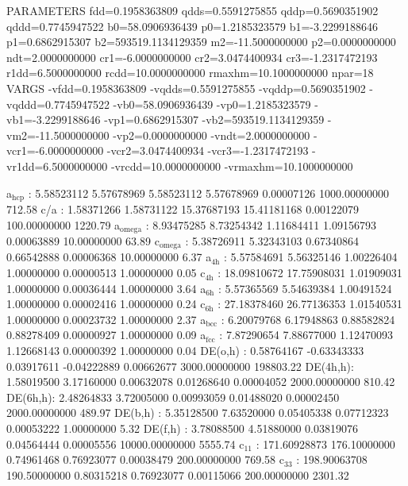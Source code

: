 \documentclass[11pt]{article}
\begin{document}
PARAMETERS
  fdd=0.1958363809 qdds=0.5591275855 qddp=0.5690351902 qddd=0.7745947522 b0=58.0906936439 p0=1.2185323579 b1=-3.2299188646 p1=0.6862915307 b2=593519.1134129359 m2=-11.5000000000 p2=0.0000000000 ndt=2.0000000000 cr1=-6.0000000000 cr2=3.0474400934 cr3=-1.2317472193 r1dd=6.5000000000 rcdd=10.0000000000 rmaxhm=10.1000000000 npar=18 
VARGS
    -vfdd=0.1958363809 -vqdds=0.5591275855 -vqddp=0.5690351902 -vqddd=0.7745947522 -vb0=58.0906936439 -vp0=1.2185323579 -vb1=-3.2299188646 -vp1=0.6862915307 -vb2=593519.1134129359 -vm2=-11.5000000000 -vp2=0.0000000000 -vndt=2.0000000000 -vcr1=-6.0000000000 -vcr2=3.0474400934 -vcr3=-1.2317472193 -vr1dd=6.5000000000 -vrcdd=10.0000000000 -vrmaxhm=10.1000000000 

a\(_{\text{hcp}}\)   :   5.58523112   5.57678969   5.58523112   5.57678969   0.00007126 1000.00000000       712.58
c/a     :   1.58371266   1.58731122  15.37687193  15.41181168   0.00122079 100.00000000      1220.79
a\(_{\text{omega}}\) :   8.93475285   8.73254342   1.11684411   1.09156793   0.00063889  10.00000000        63.89
c\(_{\text{omega}}\) :   5.38726911   5.32343103   0.67340864   0.66542888   0.00006368  10.00000000         6.37
a\(_{\text{4h}}\)    :   5.57584691   5.56325146   1.00226404   1.00000000   0.00000513   1.00000000         0.05
c\(_{\text{4h}}\)    :  18.09810672  17.75908031   1.01909031   1.00000000   0.00036444   1.00000000         3.64
a\(_{\text{6h}}\)    :   5.57365569   5.54639384   1.00491524   1.00000000   0.00002416   1.00000000         0.24
c\(_{\text{6h}}\)    :  27.18378460  26.77136353   1.01540531   1.00000000   0.00023732   1.00000000         2.37
a\(_{\text{bcc}}\)   :   6.20079768   6.17948863   0.88582824   0.88278409   0.00000927   1.00000000         0.09
a\(_{\text{fcc}}\)   :   7.87290654   7.88677000   1.12470093   1.12668143   0.00000392   1.00000000         0.04
DE(o,h) :   0.58764167  -0.63343333   0.03917611  -0.04222889   0.00662677 3000.00000000    198803.22
DE(4h,h):   1.58019500   3.17160000   0.00632078   0.01268640   0.00004052 2000.00000000       810.42
DE(6h,h):   2.48264833   3.72005000   0.00993059   0.01488020   0.00002450 2000.00000000       489.97
DE(b,h) :   5.35128500   7.63520000   0.05405338   0.07712323   0.00053222   1.00000000         5.32
DE(f,h) :   3.78088500   4.51880000   0.03819076   0.04564444   0.00005556 10000.00000000      5555.74
c\(_{\text{11}}\)    : 171.60928873 176.10000000   0.74961468   0.76923077   0.00038479 200.00000000       769.58
c\(_{\text{33}}\)    : 198.90063708 190.50000000   0.80315218   0.76923077   0.00115066 200.00000000      2301.32
\end{document}
